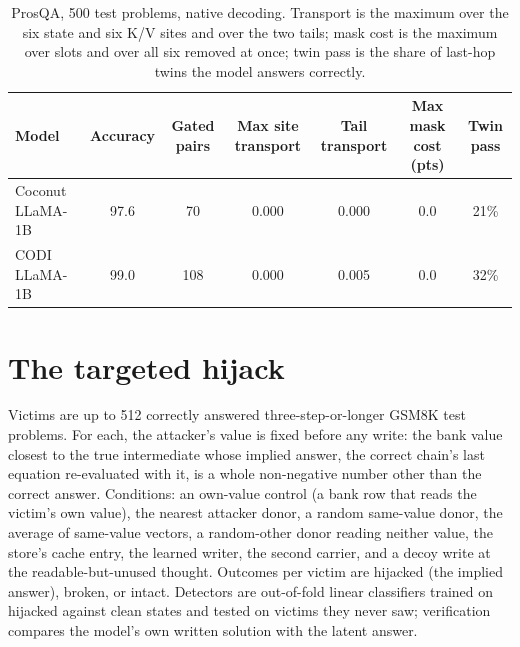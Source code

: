 \begin{table}[htbp]
\caption{ProsQA, 500 test problems, native decoding. Transport is the maximum over the six state and six K/V sites and over the two tails; mask cost is the maximum over slots and over all six removed at once; twin pass is the share of last-hop twins the model answers correctly.}
\label{tab:prosqa-full}
\centering
\scriptsize
\setlength{\tabcolsep}{3pt}
\begin{tabular}{lcccccc}
\toprule
Model & Accuracy & Gated pairs & Max site transport & Tail transport & Max mask cost (pts) & Twin pass \\
\midrule
Coconut LLaMA-1B & 97.6 & 70 & 0.000 & 0.000 & 0.0 & 21\% \\
CODI LLaMA-1B & 99.0 & 108 & 0.000 & 0.005 & 0.0 & 32\% \\
\bottomrule
\end{tabular}
\end{table}

\section{The targeted hijack}\label{app:hijack}

Victims are up to 512 correctly answered three-step-or-longer GSM8K test problems. For each, the attacker's value is fixed before any write: the bank value closest to the true intermediate whose implied answer, the correct chain's last equation re-evaluated with it, is a whole non-negative number other than the correct answer. Conditions: an own-value control (a bank row that reads the victim's own value), the nearest attacker donor, a random same-value donor, the average of same-value vectors, a random-other donor reading neither value, the store's cache entry, the learned writer, the second carrier, and a decoy write at the readable-but-unused thought. Outcomes per victim are hijacked (the implied answer), broken, or intact. Detectors are out-of-fold linear classifiers trained on hijacked against clean states and tested on victims they never saw; verification compares the model's own written solution with the latent answer.

